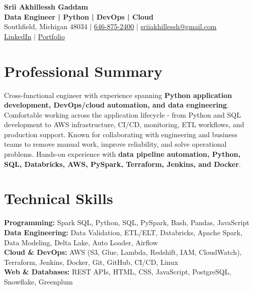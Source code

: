 \documentclass[letterpaper,10pt]{article}
\begin{document}
\fontsize{9.35pt}{10.45pt}\selectfont

\begin{center}
    {\LARGE \textbf{Srii Akhillessh Gaddam}} \\[-1pt]
    \textbf{Data Engineer | Python | DevOps | Cloud} \\[2pt]
    Southfield, Michigan 48034 $|$
    \href{tel:6468752400}{646-875-2400} $|$
    \href{mailto:sriiakhillessh@gmail.com}{sriiakhillessh@gmail.com} \\[1pt]
    \href{https://www.linkedin.com/in/srii-akhiilessh-gaddam-b48668191/}{LinkedIn} $|$
    \href{https://sriiakhillesshg.github.io/portfolio/}{Portfolio}
\end{center}
\vspace{-8pt}

\section{Professional Summary}
\small{Cross-functional engineer with experience spanning \textbf{Python application development, DevOps/cloud automation, and data engineering}. Comfortable working across the application lifecycle - from Python and SQL development to AWS infrastructure, CI/CD, monitoring, ETL workflows, and production support. Known for collaborating with engineering and business teams to remove manual work, improve reliability, and solve operational problems. Hands-on experience with \textbf{data pipeline automation, Python, SQL, Databricks, AWS, PySpark, Terraform, Jenkins, and Docker}.}

\section{Technical Skills}
\small{
\textbf{Programming:} Spark SQL, Python, SQL, PySpark, Bash, Pandas, JavaScript \\
\textbf{Data Engineering:} Data Validation, ETL/ELT, Databricks, Apache Spark, Data Modeling, Delta Lake, Auto Loader, Airflow \\
\textbf{Cloud \& DevOps:} AWS (S3, Glue, Lambda, Redshift, IAM, CloudWatch), Terraform, Jenkins, Docker, Git, GitHub, CI/CD, Linux \\
\textbf{Web \& Databases:} REST APIs, HTML, CSS, JavaScript, PostgreSQL, Snowflake, Greenplum
}

\end{document}
